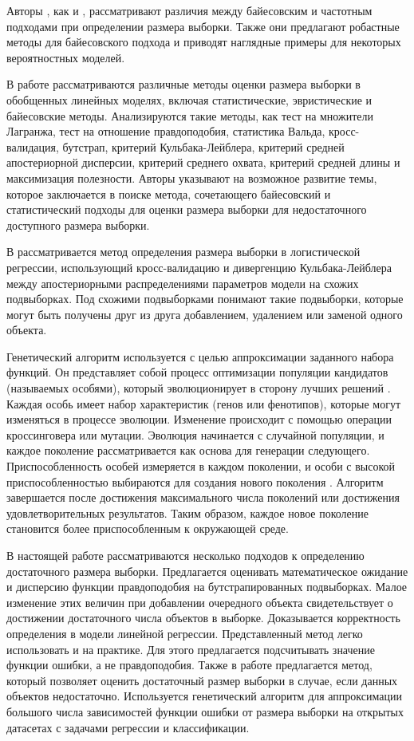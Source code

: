 Авторы \cite{Brutti2014}, как и \cite{Pezeshk2008}, рассматривают различия между байесовским и частотным подходами при определении размера выборки. Также они предлагают робастные методы для байесовского подхода и приводят наглядные примеры для некоторых вероятностных моделей.

В работе \cite{Grabovoy2022} рассматриваются различные методы оценки размера выборки в обобщенных линейных моделях, включая статистические, эвристические и байесовские методы. Анализируются такие методы, как тест на множители Лагранжа, тест на отношение правдоподобия, статистика Вальда, кросс-валидация, бутстрап, критерий Кульбака-Лейблера, критерий средней апостериорной дисперсии, критерий среднего охвата, критерий средней длины и максимизация полезности. Авторы указывают на возможное развитие темы, которое заключается в поиске метода, сочетающего байесовский и статистический подходы для оценки размера выборки для недостаточного доступного размера выборки.

В \cite{MOTRENKO2014743} рассматривается метод определения размера выборки в логистической регрессии, использующий кросс-валидацию и дивергенцию Кульбака-Лейблера между апостериорными распределениями параметров модели на схожих подвыборках. Под схожими подвыборками понимают такие подвыборки, которые могут быть получены друг из друга добавлением, удалением или заменой одного объекта.

Генетический алгоритм \citep{Goldberg1988} используется с целью аппроксимации заданного набора функций. Он представляет собой процесс оптимизации популяции кандидатов (называемых особями), который эволюционирует в сторону лучших решений \citep{Mirjalili2019}. Каждая особь имеет набор характеристик (генов или фенотипов), которые могут изменяться в процессе эволюции. Изменение происходит с помощью операции кроссинговера или мутации. Эволюция начинается с случайной популяции, и каждое поколение рассматривается как основа для генерации следующего. Приспособленность особей измеряется в каждом поколении, и особи с высокой приспособленностью выбираются для создания нового поколения \citep{Kramer2017}. Алгоритм завершается после достижения максимального числа поколений или достижения удовлетворительных результатов. Таким образом, каждое новое поколение становится более приспособленным к окружающей среде.

В настоящей работе рассматриваются несколько подходов к определению достаточного размера выборки. Предлагается оценивать математическое ожидание и дисперсию функции правдоподобия на бутстрапированных подвыборках. Малое изменение этих величин при добавлении очередного объекта свидетельствует о достижении достаточного числа объектов в выборке. Доказывается корректность определения в модели линейной регрессии. Представленный метод легко использовать и на практике. Для этого предлагается подсчитывать значение функции ошибки, а не правдоподобия. Также в работе предлагается метод, который позволяет оценить достаточный размер выборки в случае, если данных объектов недостаточно. Используется генетический алгоритм для аппроксимации большого числа зависимостей функции ошибки от размера выборки на открытых датасетах с задачами регрессии и классификации.

